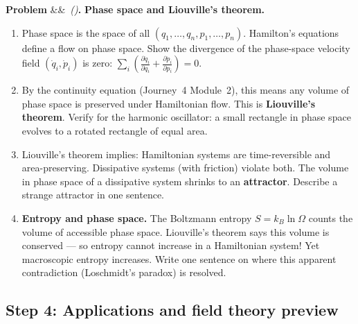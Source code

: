 \documentclass[12pt,a4paper]{article}
\newcounter{problem}
\newenvironment{problem}[1][]{\refstepcounter{problem}\par\vspace{6pt}\noindent\textbf{\color{MidBlue}Problem \theproblem}\ifx&#1&\else\ \textit{(#1)}\fi\textbf{.}\enskip}{\par\vspace{4pt}}
\begin{document}
\begin{problem}
\label{prob:phase_space}
\textbf{Phase space and Liouville's theorem.}
\begin{enumerate}[label=(\alph*),topsep=2pt]
  \item Phase space is the space of all $(q_1,\ldots,q_n,p_1,\ldots,p_n)$. Hamilton's equations define a flow on phase space. Show the divergence of the phase-space velocity field $(\dot q_i,\dot p_i)$ is zero:
  $\sum_i\left(\frac{\partial\dot q_i}{\partial q_i}+\frac{\partial\dot p_i}{\partial p_i}\right) = 0$.
  \item By the continuity equation (Journey~4 Module~2), this means any volume of phase space is preserved under Hamiltonian flow. This is \textbf{Liouville's theorem}. Verify for the harmonic oscillator: a small rectangle in phase space evolves to a rotated rectangle of equal area.
  \item Liouville's theorem implies: Hamiltonian systems are time-reversible and area-preserving. Dissipative systems (with friction) violate both. The volume in phase space of a dissipative system shrinks to an \textbf{attractor}. Describe a strange attractor in one sentence.
  \item \textbf{Entropy and phase space.} The Boltzmann entropy $S = k_B\ln\Omega$ counts the volume of accessible phase space. Liouville's theorem says this volume is conserved --- so entropy cannot increase in a Hamiltonian system! Yet macroscopic entropy increases. Write one sentence on where this apparent contradiction (Loschmidt's paradox) is resolved.
\end{enumerate}
\end{problem}

\subsection{Step 4: Applications and field theory preview}
\end{document}

